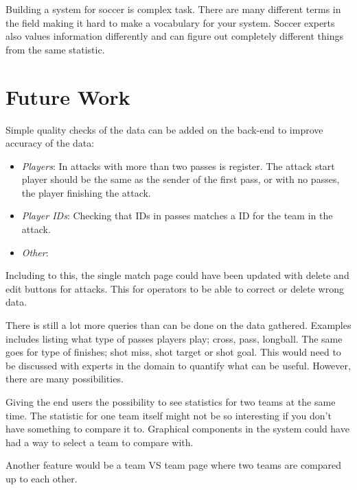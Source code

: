 Building a system for soccer is complex task. There are many different terms in the field making it hard to make a vocabulary for your system. Soccer experts also values information differently and can figure out completely different things from the same statistic. 

\section{Future Work}

Simple quality checks of the data can be added on the back-end to improve accuracy of the data:

\begin{itemize}
\item \emph{Players}: In attacks with more than two passes is register. The attack start player should be the same as the sender of the first pass, or with no passes, the player finishing the attack. 
\item \emph{Player IDs}: Checking that IDs in passes matches a ID for the team in the attack.
\item \emph{Other}: 
\end{itemize}

Including to this, the single match page could have been updated with delete and edit buttons for attacks. This for operators to be able to correct or delete wrong data.

There is still a lot more queries than can be done on the data gathered. Examples includes listing what type of passes players play; cross, pass, longball. The same goes for type of finishes; shot miss, shot target or shot goal. This would need to be discussed with experts in the domain to quantify what can be useful. However, there are many possibilities. 

Giving the end users the possibility to see statistics for two teams at the same time. The statistic for one team itself might not be so interesting if you don't have something to compare it to. Graphical components in the system could have had a way to select a team to compare with.

Another feature would be a team VS team page where two teams are compared up to each other.



